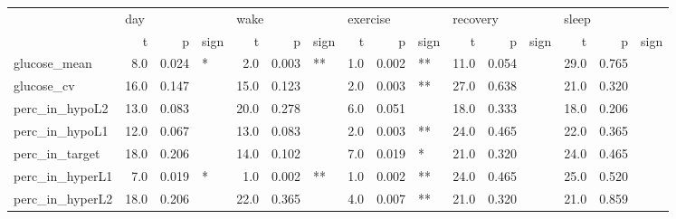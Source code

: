 \begin{tabular}{lrrlrrlrrlrrlrrl}
\toprule
{} & \multicolumn{3}{l}{day} & \multicolumn{3}{l}{wake} & \multicolumn{3}{l}{exercise} & \multicolumn{3}{l}{recovery} & \multicolumn{3}{l}{sleep} \\
{} &     t &      p & sign &     t &      p & sign &        t &      p & sign &        t &      p & sign &     t &      p & sign \\
\midrule
glucose_mean    &   8.0 &  0.024 &    * &   2.0 &  0.003 &   ** &      1.0 &  0.002 &   ** &     11.0 &  0.054 &      &  29.0 &  0.765 &      \\
glucose_cv      &  16.0 &  0.147 &      &  15.0 &  0.123 &      &      2.0 &  0.003 &   ** &     27.0 &  0.638 &      &  21.0 &  0.320 &      \\
perc_in_hypoL2  &  13.0 &  0.083 &      &  20.0 &  0.278 &      &      6.0 &  0.051 &      &     18.0 &  0.333 &      &  18.0 &  0.206 &      \\
perc_in_hypoL1  &  12.0 &  0.067 &      &  13.0 &  0.083 &      &      2.0 &  0.003 &   ** &     24.0 &  0.465 &      &  22.0 &  0.365 &      \\
perc_in_target  &  18.0 &  0.206 &      &  14.0 &  0.102 &      &      7.0 &  0.019 &    * &     21.0 &  0.320 &      &  24.0 &  0.465 &      \\
perc_in_hyperL1 &   7.0 &  0.019 &    * &   1.0 &  0.002 &   ** &      1.0 &  0.002 &   ** &     24.0 &  0.465 &      &  25.0 &  0.520 &      \\
perc_in_hyperL2 &  18.0 &  0.206 &      &  22.0 &  0.365 &      &      4.0 &  0.007 &   ** &     21.0 &  0.320 &      &  21.0 &  0.859 &      \\
\bottomrule
\end{tabular}
